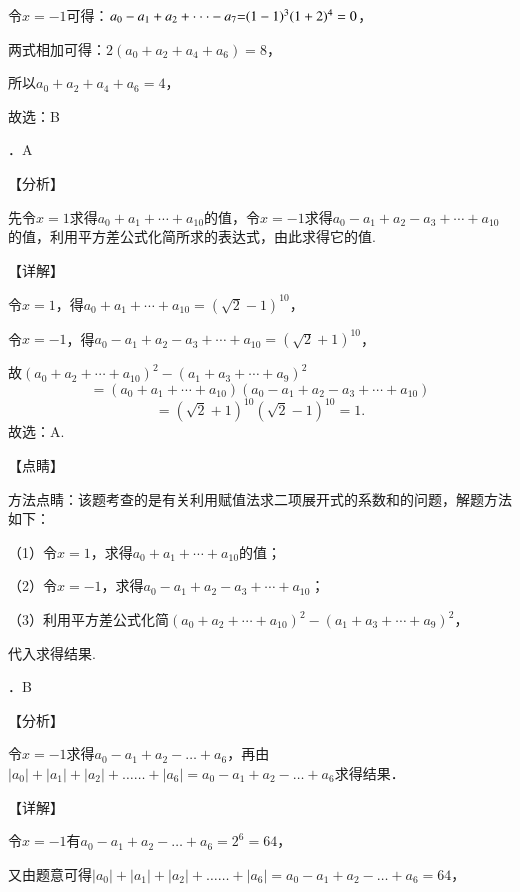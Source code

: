 \documentclass[a4paper,11pt,UTF8,twoside]{ctexart} %
\begin{document}
\noindent 令$x=-1$可得：$a_{0} -a_{1} +a_{2} +\cdot \cdot \cdot -a_{7} {\rm =}(1-1)^{3} (1+2)^{4} =0$，

\noindent 两式相加可得：$2(a_{0} +a_{2} +a_{4} +a_{6} )=8$，

\noindent 所以$a_{0} +a_{2} +a_{4} +a_{6} =4$，

\noindent 故选：B

．A

\noindent 【分析】

\noindent 先令$x=1$求得$a_{0} +a_{1} +\cdots +a_{10} $的值，令$x=-1$求得$a_{0} -a_{1} +a_{2} -a_{3} +\cdots +a_{10} $的值，利用平方差公式化简所求的表达式，由此求得它的值.

\noindent 【详解】

\noindent 令$x=1$，得$a_{0} +a_{1} +\cdots +a_{10} =\left(\sqrt{2} -1\right)^{10} $，

\noindent 令$x=-1$，得$a_{0} -a_{1} +a_{2} -a_{3} +\cdots +a_{10} =\left(\sqrt{2} +1\right)^{10} $，

\noindent 故$\left(a_{0} +a_{2} +\cdots +a_{10} \right)^{2} -\left(a_{1} +a_{3} +\cdots +a_{9} \right)^{2} $
\[=\left(a_{0} +a_{1} +\cdots +a_{10} \right)\left(a_{0} -a_{1} +a_{2} -a_{3} +\cdots +a_{10} \right)\] 
\[=\left(\sqrt{2} +1\right)^{10} \left(\sqrt{2} -1\right)^{10} =1.\] 
故选：A.

\noindent 【点睛】

\noindent 方法点睛：该题考查的是有关利用赋值法求二项展开式的系数和的问题，解题方法如下：

\noindent （1）令$x=1$，求得$a_{0} +a_{1} +\cdots +a_{10} $的值；

\noindent （2）令$x=-1$，求得$a_{0} -a_{1} +a_{2} -a_{3} +\cdots +a_{10} $；

\noindent （3）利用平方差公式化简$\left(a_{0} +a_{2} +\cdots +a_{10} \right)^{2} -\left(a_{1} +a_{3} +\cdots +a_{9} \right)^{2} $，

\noindent 代入求得结果.

．B

\noindent 【分析】

\noindent 令$x=-1$求得$a_{0} -a_{1} +a_{2} -\ldots +a_{6} $，再由$|a_{0} |+|a_{1} |+|a_{2} |+\ldots \ldots +|a_{6} |=a_{0} -a_{1} +a_{2} -\ldots +a_{6} $求得结果．

\noindent 【详解】

\noindent 令$x=-1$有$a_{0} -a_{1} +a_{2} -\ldots +a_{6} =2^{6} =64$，

\noindent 又由题意可得$|a_{0} |+|a_{1} |+|a_{2} |+\ldots \ldots +|a_{6} |=a_{0} -a_{1} +a_{2} -\ldots +a_{6} =64$，
\end{document}

